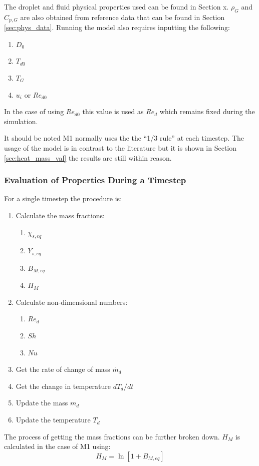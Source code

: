 \documentclass[../Interim_Report_Master]{subfiles}
\begin{document}
The droplet and fluid physical properties used can be found in Section x. $\rho_G$ and $C_{p,G}$ are also obtained from reference data that can be found in Section \ref{sec:phys_data}. Running the model also requires inputting the following:
\begin{enumerate}
	\item $D_0$
	\item $T_{d0}$
	\item $T_G$
	\item $u_i$ or $Re_{d0}$
\end{enumerate}

In the case of using $Re_{d0}$ this value is used as $Re_d$ which remains fixed during the simulation.

It should be noted M1 normally uses the the ``1/3 rule'' at each timestep. The usage of the model is in contrast to the literature but it is shown in Section \ref{sec:heat_mass_val} the results are still within reason. 

\subsubsection{Evaluation of Properties During a Timestep}
For a single timestep the procedure is:
\begin{enumerate}
	\item Calculate the mass fractions:
		\begin{enumerate}
			\item $\chi_{s,eq}$
			\item $Y_{s,eq}$
			\item $B_{M,eq}$
			\item $H_M$
		\end{enumerate}
	\item Calculate non-dimensional numbers:
	\begin{enumerate}
		\item $Re_d$
		\item $Sh$
		\item $Nu$
	\end{enumerate}
	\item Get the rate of change of mass $\dot{m_d}$ 
	\item Get the change in temperature $dT_d/dt$
	\item Update the mass $m_d$
	\item Update the temperature $T_d$
\end{enumerate}

The process of getting the mass fractions can be further broken down. $H_M$ is calculated in the case of M1 using:
\begin{equation}
H_M=\ln\left[1+B_{M,eq}\right]
\end{equation}
\end{document}

